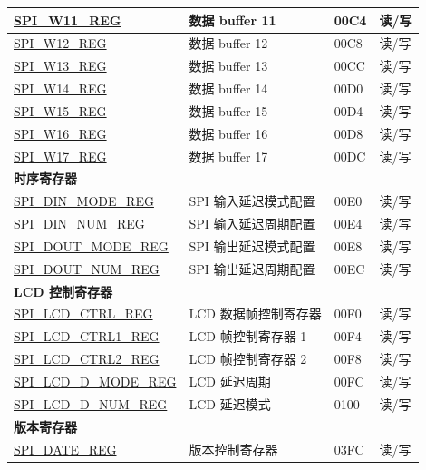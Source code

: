 \begin{longtable}{ | p{6cm} | p{7.2cm} | p{1.3cm} | p{1cm} | }
\hyperref[regdesc:SPIW11REG]{SPI\_W11\_REG} & 数据 buffer 11 & \hexprefix{}00C4 &读/写 \\ \hline
\hyperref[regdesc:SPIW12REG]{SPI\_W12\_REG} & 数据 buffer 12 & \hexprefix{}00C8 &读/写 \\ \hline
\hyperref[regdesc:SPIW13REG]{SPI\_W13\_REG} & 数据 buffer 13 & \hexprefix{}00CC &读/写 \\ \hline
\hyperref[regdesc:SPIW14REG]{SPI\_W14\_REG} & 数据 buffer 14 & \hexprefix{}00D0 &读/写 \\ \hline
\hyperref[regdesc:SPIW15REG]{SPI\_W15\_REG} & 数据 buffer 15 & \hexprefix{}00D4 &读/写 \\ \hline
\hyperref[regdesc:SPIW16REG]{SPI\_W16\_REG} & 数据 buffer 16 & \hexprefix{}00D8 &读/写 \\ \hline
\hyperref[regdesc:SPIW17REG]{SPI\_W17\_REG} & 数据 buffer 17 & \hexprefix{}00DC &读/写 \\ \hline
\multicolumn{4}{|l|}{\textbf{时序寄存器}} \\ \hline
\hyperref[regdesc:SPIDINMODEREG]{SPI\_DIN\_MODE\_REG} & SPI 输入延迟模式配置 & \hexprefix{}00E0 &读/写 \\ \hline
\hyperref[regdesc:SPIDINNUMREG]{SPI\_DIN\_NUM\_REG} & SPI 输入延迟周期配置 & \hexprefix{}00E4 &读/写 \\ \hline
\hyperref[regdesc:SPIDOUTMODEREG]{SPI\_DOUT\_MODE\_REG} & SPI 输出延迟模式配置 & \hexprefix{}00E8 &读/写 \\ \hline
\hyperref[regdesc:SPIDOUTNUMREG]{SPI\_DOUT\_NUM\_REG} & SPI 输出延迟周期配置 & \hexprefix{}00EC &读/写 \\ \hline
\multicolumn{4}{|l|}{\textbf{LCD 控制寄存器}} \\ \hline
\hyperref[regdesc:SPILCDCTRLREG]{SPI\_LCD\_CTRL\_REG} & LCD 数据帧控制寄存器 & \hexprefix{}00F0 &读/写 \\ \hline
\hyperref[regdesc:SPILCDCTRL1REG]{SPI\_LCD\_CTRL1\_REG} & LCD 帧控制寄存器 1 & \hexprefix{}00F4 &读/写 \\ \hline
\hyperref[regdesc:SPILCDCTRL2REG]{SPI\_LCD\_CTRL2\_REG} & LCD 帧控制寄存器 2 & \hexprefix{}00F8 &读/写 \\ \hline
\hyperref[regdesc:SPILCDDMODEREG]{SPI\_LCD\_D\_MODE\_REG} & LCD 延迟周期 & \hexprefix{}00FC &读/写 \\ \hline
\hyperref[regdesc:SPILCDDNUMREG]{SPI\_LCD\_D\_NUM\_REG} & LCD 延迟模式 & \hexprefix{}0100 &读/写 \\ \hline
\multicolumn{4}{|l|}{\textbf{版本寄存器}} \\ \hline
\hyperref[regdesc:SPIDATEREG]{SPI\_DATE\_REG} & 版本控制寄存器 & \hexprefix{}03FC &读/写 \\ \hline
\end{longtable}
